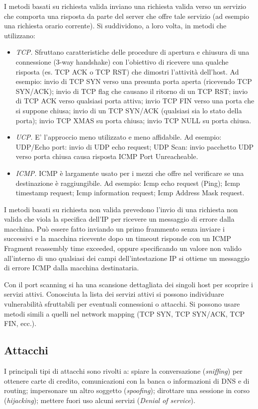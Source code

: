 I metodi basati su richiesta valida inviano una richiesta valida verso un servizio che comporta una risposta da parte del server che offre tale servizio (ad esempio una richiesta orario corrente). Si suddividono, a loro volta, in metodi che utilizzano:
\begin{itemize}
    \item \textit{TCP.} Sfruttano caratteristiche delle procedure di apertura e chiusura di una connessione (3-way handshake) con l'obiettivo di ricevere una qualche risposta (es. TCP ACK o TCP RST) che dimostri l’attività dell’host. Ad esempio: invio di TCP SYN verso una presunta porta aperta (ricevendo TCP SYN/ACK); invio di TCP flag che causano il ritorno di un TCP RST; invio di TCP ACK verso qualsiasi porta attiva; invio TCP FIN verso una porta che si suppone chiusa; invio di un TCP SYN/ACK (qualsiasi sia lo stato della porta); invio TCP XMAS su porta chiusa; invio TCP NULL su porta chiusa.
    \item \textit{UCP.} E' l'approccio meno utilizzato e meno affidabile. Ad esempio: UDP/Echo port: invio di UDP echo request; UDP Scan: invio pacchetto UDP verso porta chiusa causa risposta ICMP Port Unreacheable.
    \item \textit{ICMP.} ICMP è largamente usato per i mezzi che offre nel verificare se una destinazione è raggiungibile. Ad esempio: Icmp echo request (Ping); Icmp timestamp request; Icmp information request; Icmp Address Mask request.
\end{itemize}

I metodi basati su richiesta non valida prevedono l'invio di una richiesta non valida che viola la specifica dell’IP per ricevere un messaggio di errore dalla macchina. Può essere fatto inviando un primo frammento senza inviare i successivi e la macchina ricevente dopo un timeout risponde con un ICMP Fragment reassembly time exceeded, oppure specificando un valore non valido all’interno di uno qualsiasi dei campi dell’intestazione IP si ottiene un messaggio di errore ICMP dalla macchina destinataria.

Con il port scanning si ha una scansione dettagliata dei singoli host per scoprire i servizi attivi. Conosciuta la lista dei servizi attivi si possono individuare vulnerabilità sfruttabili per eventuali connessioni o attacchi. Si possono usare metodi simili a quelli nel network mapping (TCP SYN, TCP SYN/ACK, TCP FIN, ecc.).

\subsection{Attacchi}
I principali tipi di attacchi sono rivolti a: spiare la conversazione (\textit{sniffing}) per ottenere carte di credito, comunicazioni con la banca o informazioni di DNS e di routing; impersonare un altro soggetto (\textit{spoofing}); dirottare una sessione in corso (\textit{hijacking}); mettere fuori uso alcuni servizi (\textit{Denial of service}).

